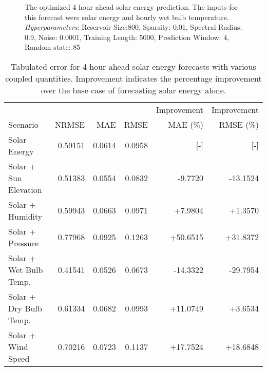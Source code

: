 \begin{figure*}[h]
  \centering
  
  \caption{The optimized 4 hour ahead solar energy prediction. The inputs for this forecast were solar energy and hourly wet bulb temperature. \textit{Hyperparameters}: Reservoir Size:800, Sparsity: 0.01, Spectral Radius: 0.9, Noise: 0.0001, Training Length: 5000, Prediction Window: 4, Random state: 85}
  \label{fig:solar04}
\end{figure*}
  \begin{table*}[h]
    \centering
    \caption{Tabulated error for 4-hour ahead solar energy forecasts with various coupled quantities. Improvement indicates the percentage improvement over the base case of forecasting solar energy alone.}
    \label{tab:solar04}
    \begin{tabular}{l|r|r|r|r|r}
      & & & & Improvement & Improvement \\
      Scenario & NRMSE & MAE & RMSE & MAE (\%) & RMSE (\%)\\
      \hline
      Solar Energy & 0.59151 & 0.0614 & 0.0958 & [-] & [-] \\
      Solar + Sun Elevation & 0.51383 & 0.0554 &  0.0832 & -9.7720 & -13.1524 \\
      Solar + Humidity & 0.59943 & 0.0663 & 0.0971 & +7.9804 & +1.3570 \\
      Solar + Pressure & 0.77968 & 0.0925  & 0.1263 & +50.6515 & +31.8372 \\
      Solar + Wet Bulb Temp. & 0.41541 & 0.0526 & 0.0673 & -14.3322 & -29.7954 \\
      Solar + Dry Bulb Temp. & 0.61334 & 0.0682 & 0.0993 & +11.0749 & +3.6534 \\
      Solar + Wind Speed & 0.70216 & 0.0723 & 0.1137 & +17.7524 & +18.6848 \\
    \end{tabular}
  \end{table*}
